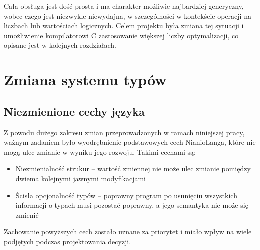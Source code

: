\documentclass[licencjacka]{pracamgr}
\begin{document}
Cała obsługa jest dość prosta i ma charakter możliwie najbardziej generyczny, wobec czego jest niezwykle niewydajna, w szczególności w kontekście
operacji na liczbach lub wartościach logicznych. Celem projektu była zmiana tej sytuacji i umożliwienie kompilatorowi C zastosowanie większej liczby
optymalizacji, co opisane jest w kolejnych rozdziałach.


\chapter{Zmiana systemu typów}
\section{Niezmienione cechy języka}
Z powodu dużego zakresu zmian przeprowadzonych w ramach niniejszej pracy, ważnym zadaniem było wyodrębnienie
podstawowych cech NianioLanga, które nie mogą ulec zmianie w wyniku jego rozwoju. Takimi cechami są:
\begin{itemize}
 \item Niezmienialność strukur -- wartość zmiennej nie może ulec zmianie pomiędzy dwiema kolejnymi jawnymi
 modyfikacjami
 \item Ścisła opcjonalność typów -- poprawny program po usunięciu wszystkich informacji o typach musi pozostać
 poprawny, a jego semantyka nie może się zmienić
\end{itemize}
Zachowanie powyższych cech zostało uznane za priorytet i miało wpływ na wiele podjętych podczas projektowania
decyzji.
\end{document}
